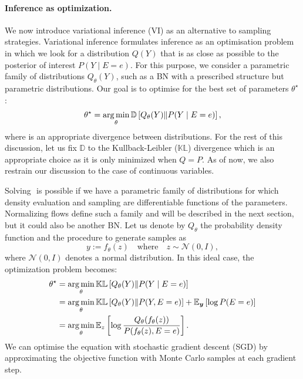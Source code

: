 
\paragraph{Inference as optimization.}
We now introduce variational inference (VI) as an alternative to sampling strategies. Variational inference formulates inference as an optimisation problem in which we look for a distribution $Q(Y)$ that is as close as possible to the posterior of interest $P(Y\mid E=e)$. For this purpose, we consider a parametric family of distributions $Q_\theta(Y)$, such as a BN with a prescribed structure but parametric distributions. Our goal is to optimise for the best set of parameters $\theta^\star$:
\begin{align}
  \theta^\star = \operatorname*{arg\,min}_\theta \mathbb{D}\left[Q_\theta(Y)\Vert P(Y\mid E=e) \right], \label{eq:obj_VI}
\end{align}
where is an appropriate divergence between distributions. For the rest of this discussion, let us fix $\mathbb{D}$ to the Kullback-Leibler ($\mathbb{KL}$) divergence which is an appropriate choice as it is only minimized when $Q = P$. As of now, we also restrain our discussion to the case of continuous variables.

Solving $\label{eq:obj_VI}$ is possible if we have a parametric family of distributions for which density evaluation and sampling are differentiable functions of the parameters. Normalizing flows define such a family and will be described in the next section, but it could also be another BN. Let us denote by $Q_\theta$ the probability density function and the procedure to generate samples as $$ y := f_\theta(z) \quad\text{where}\quad z\sim \mathcal{N}(0, I),$$
where $\mathcal{N}(0, I)$ denotes a normal distribution.
In this ideal case, the optimization problem becomes:
\begin{align}
  \theta^\star &= \operatorname*{arg\,min}_\theta \mathbb{KL}\left[Q_\theta(Y)\Vert P(Y\mid E=e) \right]\\ \label{eq:VI_optim}
  &= \operatorname*{arg\,min}_\theta \mathbb{KL}\left[Q_\theta(Y)\Vert P(Y, E=e) \right] + \mathbb{E}_{\bm y}\left[\log P(E=e)\right]\\
  &= \operatorname*{arg\,min}_\theta \mathbb{E}_{z}\left[ \log \frac{Q_\theta(f_\theta(z))}{P(f_\theta(z), E=e)} \right].
\end{align}
We can optimise the equation with stochastic gradient descent (SGD) by approximating the objective function with Monte Carlo samples at each gradient step.

